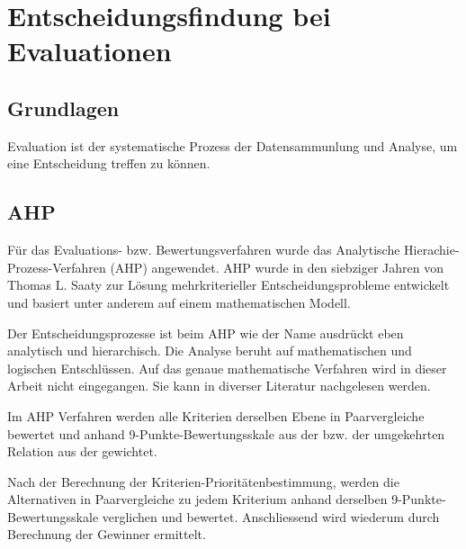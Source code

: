 
\cleardoublepage
\chapter{Entscheidungsfindung bei Evaluationen}\label{kab:Entscheidungsfindung}
\section{Grundlagen}
Evaluation ist der systematische Prozess der Datensammunlung und Analyse, um eine Entscheidung treffen zu können.
\section{AHP}
Für das Evaluations- bzw. Bewertungsverfahren wurde das Analytische Hierachie-Prozess-Verfahren (AHP) angewendet. AHP wurde in den siebziger Jahren von Thomas L. Saaty zur Lösung mehrkriterieller Entscheidungsprobleme entwickelt und basiert unter anderem auf einem mathematischen Modell.
\cite{Reichardt2003}

Der Entscheidungsprozesse ist beim AHP wie der Name ausdrückt eben analytisch und hierarchisch. Die Analyse beruht auf mathematischen und logischen Entschlüssen. Auf das genaue mathematische Verfahren wird in dieser Arbeit nicht eingegangen. Sie kann in diverser Literatur nachgelesen werden. \cite{Reichardt2003}

Im AHP Verfahren werden alle Kriterien derselben Ebene in Paarvergleiche bewertet und anhand 9-Punkte-Bewertungsskale aus der  bzw. der umgekehrten Relation aus der  gewichtet.

Nach der Berechnung der Kriterien-Prioritätenbestimmung, werden die Alternativen in Paarvergleiche zu jedem Kriterium anhand derselben 9-Punkte-Bewertungsskale verglichen und bewertet. Anschliessend wird wiederum durch Berechnung der Gewinner ermittelt.

